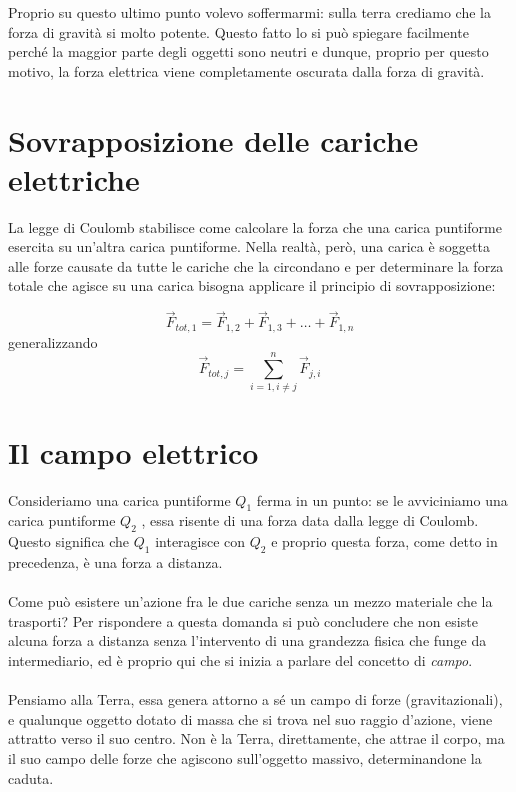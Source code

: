 Proprio su questo ultimo punto volevo soffermarmi: sulla terra crediamo che la forza di gravità si molto potente.
Questo fatto lo si può spiegare facilmente perché la maggior parte degli oggetti sono neutri e dunque, proprio per questo motivo, la forza elettrica viene completamente oscurata dalla forza di gravità.

\section{Sovrapposizione delle cariche elettriche}
La legge di Coulomb stabilisce come calcolare la forza che una carica puntiforme
esercita su un’altra carica puntiforme. Nella realtà, però, una carica è soggetta
alle forze causate da tutte le cariche che la circondano e per determinare la forza
totale che agisce su una carica bisogna applicare il principio di sovrapposizione:

\begin{equation*}
    \vec{F}_{tot,1} = \vec{F}_{1,2} + \vec{F}_{1,3} + \dots + \vec{F}_{1,n}
\end{equation*}
generalizzando
\begin{equation}
    \vec{F}_{tot,j} = \sum_{i = 1, i\neq j}^n \vec{F}_{j,i}
\end{equation}

\section{Il campo elettrico}

Consideriamo una carica puntiforme $Q_1$
 ferma in un punto: se le avviciniamo una carica puntiforme $Q_2$ , essa risente di una forza data dalla legge di Coulomb. Questo
significa che $Q_1$ interagisce con $Q_2$ e proprio questa forza, come detto in precedenza, è una forza a distanza.
\paragraph{}
Come può esistere un’azione fra le due
cariche senza un mezzo materiale che la trasporti?
Per rispondere a questa domanda si può concludere che non esiste alcuna forza a distanza senza l'intervento di una grandezza fisica che funge da intermediario, ed è proprio qui che si inizia a parlare del concetto di \textit{campo}.
\paragraph{}
Pensiamo alla Terra, essa genera attorno a sé un campo di forze (gravitazionali), e qualunque oggetto dotato di massa che si trova nel suo raggio d'azione, viene attratto verso il suo centro. Non è la Terra, direttamente, che attrae il corpo, ma il suo campo delle forze che agiscono sull'oggetto massivo, determinandone la caduta.

